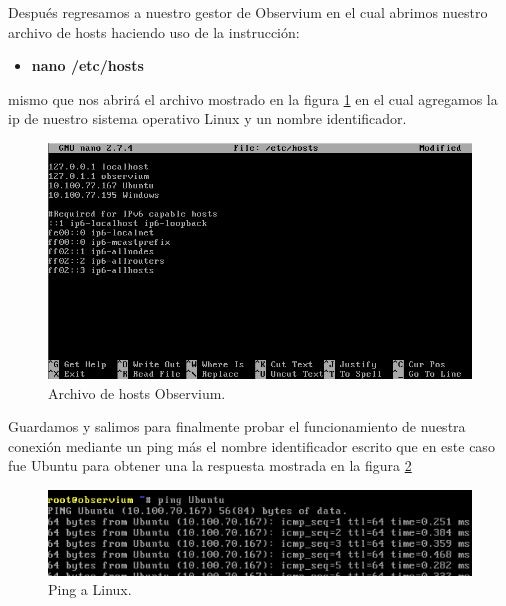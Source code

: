 Después regresamos a nuestro gestor de Observium en el cual abrimos nuestro archivo de hosts haciendo uso de la instrucción:
\begin{itemize}
\item \textbf{nano /etc/hosts}
\end{itemize}
mismo que nos abrirá el archivo mostrado en la figura \ref{image:hosts} en el cual agregamos la ip de nuestro sistema operativo Linux y un nombre identificador.
\FloatBarrier
\begin{figure}[htbp!]
		\centering
			\includegraphics[width=.9 \textwidth]{images/hosts}
		\caption{Archivo de hosts Observium.}
		\label{image:hosts}
\end{figure}
\FloatBarrier
Guardamos y salimos para finalmente probar el funcionamiento de nuestra conexión mediante un ping más el nombre identificador escrito que en este caso fue Ubuntu para obtener una la respuesta mostrada en la figura \ref{image:ping}
\FloatBarrier
\begin{figure}[htbp!]
		\centering
			\includegraphics[width=.9 \textwidth]{images/ping}
		\caption{Ping a Linux.}
		\label{image:ping}
\end{figure}
\FloatBarrier

